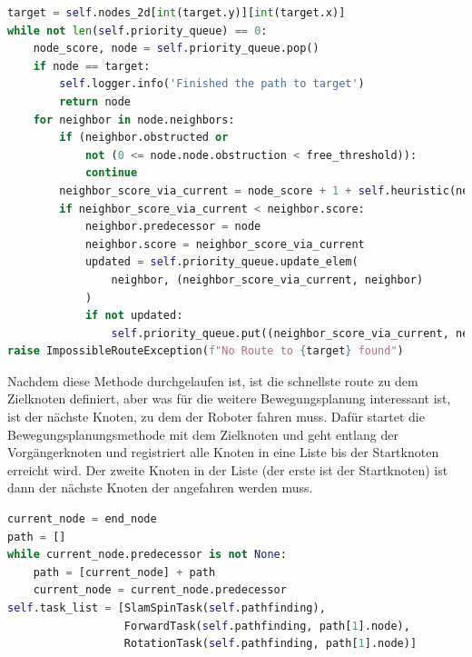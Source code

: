 \begin{lstlisting}[language=python,label={lst:run_astar}]
target = self.nodes_2d[int(target.y)][int(target.x)]
while not len(self.priority_queue) == 0:
    node_score, node = self.priority_queue.pop()
    if node == target:
        self.logger.info('Finished the path to target')
        return node
    for neighbor in node.neighbors:
        if (neighbor.obstructed or
            not (0 <= node.node.obstruction < free_threshold)):
            continue
        neighbor_score_via_current = node_score + 1 + self.heuristic(neighbor, target)
        if neighbor_score_via_current < neighbor.score:
            neighbor.predecessor = node
            neighbor.score = neighbor_score_via_current
            updated = self.priority_queue.update_elem(
                neighbor, (neighbor_score_via_current, neighbor)
            )
            if not updated:
                self.priority_queue.put((neighbor_score_via_current, neighbor))
raise ImpossibleRouteException(f"No Route to {target} found")
\end{lstlisting}

Nachdem diese Methode durchgelaufen ist, ist die schnellste route zu dem Zielknoten definiert, aber was für die weitere
Bewegungsplanung interessant ist, ist der nächste Knoten, zu dem der Roboter fahren muss.
Dafür startet die Bewegungsplanungsmethode mit dem Zielknoten und geht entlang der Vorgängerknoten und registriert alle
Knoten in eine Liste bis der Startknoten erreicht wird.
Der zweite Knoten in der Liste (der erste ist der Startknoten) ist dann der nächste Knoten der angefahren werden muss.

\begin{lstlisting}[language=python,label={lst:pathfinding}]
current_node = end_node
path = []
while current_node.predecessor is not None:
    path = [current_node] + path
    current_node = current_node.predecessor
self.task_list = [SlamSpinTask(self.pathfinding),
                  ForwardTask(self.pathfinding, path[1].node),
                  RotationTask(self.pathfinding, path[1].node)]
\end{lstlisting}

